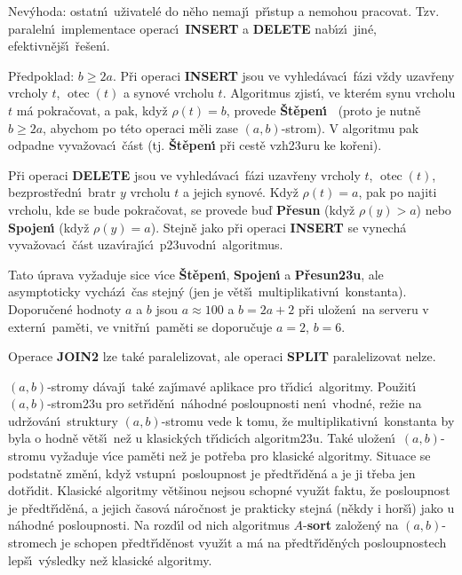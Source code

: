 \documentclass[a4paper,12pt]{article}
\DeclareMathOperator*{\otec}{otec}
\begin{document}
\flushpar Nev\'yhoda: ostatn\'\i\ u\v zivatel\'e  
do n\v eho nemaj\'\i\ p\v r\'\i stup a nemohou pracovat. Tzv. paraleln\'\i\ 
implementace operac\'\i\ {\bf INSERT} a {\bf DELETE} nab\'\i z\'\i\ jin\'e, 
efektivn\v ej\v s\'\i\ \v re\v sen\'\i .
\medskip

\flushpar P\v redpoklad: $b\ge 2a$. \newline 
P\v ri operaci {\bf INSERT} jsou ve vyhled\'avac\'\i\ f\'azi v\v zdy 
uzav\v reny vrcholy $t$, $\otec(t)$ a synov\'e vrcholu $t$. 
Algoritmus zjist\'\i , ve kter\'em synu vrcholu $t$ m\'a 
pokra\v covat, a pak, kdy\v z $\rho (t)=b$, provede {\bf \v St\v epen\'\i\ }
(proto je nutn\v e $b\ge 2a$, abychom po t\'eto ope\-raci m\v eli 
zase $(a,b)$-strom). V algoritmu pak odpadne vyva\-\v zo\-vac\'\i\ 
\v c\'ast (tj. {\bf \v St\v epen\'\i} p\v ri cest\v e vzh\accent23uru ke 
ko\v reni).
\medskip

\flushpar P\v ri operaci {\bf DELETE} jsou ve vyhled\'avac\'\i\ f\'azi uzav\v reny 
vrcholy $t$, $\otec(t)$, bezprost\v redn\'\i\ bratr $y$ vrcholu $
t$ a 
jejich synov\'e. 
Kdy\v z $\rho (t)=a$, pak po najiti vrcholu, kde se bude 
pokra\v covat, se provede bu\v d {\bf P\v resun} (kdy\v z $\rho (
y)>a$) nebo 
{\bf Spojen\'\i} (kdy\v z $\rho (y)=a$). Stejn\v e jako p\v ri operaci 
{\bf INSERT} se vynech\'a vyva\-\v zo\-vac\'\i\ \v c\'ast 
uzav\'\i raj\'\i c\'\i\ p\accent23uvodn\'\i\ algoritmus.
\medskip

\flushpar Tato \'uprava vy\v zaduje sice v\'\i ce {\bf \v St\v epen\'\i }, {\bf Spojen\'\i} a
{\bf P\v resun\accent23u}, ale asymptoticky vych\'az\'\i\ \v cas stejn\'y 
(jen je v\v et\v s\'\i\ multiplikativn\'\i\ konstanta). Doporu\v cen\'e 
hodnoty $a$ a $b$ jsou $a\approx 100$ a $b=2a+2$ p\v ri ulo\v zen\'\i\ na serveru 
v extern\'\i\ pam\v eti, ve vnit\v rn\'\i\ pam\v eti 
se doporu\v cuje $a=2$, $b=6$.
\medskip

\flushpar Operace {\bf JOIN2} lze tak\'e paralelizovat, ale operaci {\bf SPLIT  }
paralelizovat nelze.
\medskip

\flushpar$(a,b)$-stromy d\'avaj\'\i\ tak\'e zaj\'\i mav\'e aplikace pro 
t\v r\'\i dic\'\i\ 
algoritmy. Pou\v zit\'\i\ $(a,b)$-strom\accent23u pro set\v r\'\i d\v en\'\i\ 
n\'ahodn\'e posloupnosti nen\'\i\ vhodn\'e, re\v zie na udr\v zov\'an\'\i\ 
struktury $(a,b)$-stromu vede k tomu, \v ze multiplikativn\'\i\ 
konstanta by byla o hodn\v e v\v et\v s\'\i\ ne\v z u klasick\'ych 
t\v r\'\i dic\'\i ch algoritm\accent23u. Tak\'e ulo\v zen\'\i\ $(
a,b)$-stromu 
vy\v zaduje v\'\i ce pam\v eti ne\v z je pot\v reba pro klasick\'e 
algoritmy. Situace se podstatn\v e zm\v en\'\i , kdy\v z vstupn\'\i\ 
posloupnost je p\v red\-t\v r\'\i\-d\v en\'a a je ji t\v reba jen dot\v r\'\i dit. 
Klasick\'e algoritmy v\v et\v sinou nejsou schopn\'e vyu\v z\'\i t faktu, \v ze 
posloupnost je p\v redt\v r\'\i d\v en\'a, a jejich \v casov\'a n\'aro\v cnost je 
prakticky stejn\'a (n\v ekdy i hor\v s\'\i ) jako u n\'ahodn\'e 
posloupnosti. Na rozd\'\i l od nich algoritmus $A$-{\bf sort }
zalo\v zen\'y na $(a,b)$-stromech je schopen p\v redt\v r\'\i d\v enost 
vyu\v z\'\i t a m\'a na p\v redt\v r\'\i d\v en\'ych posloupnostech lep\v s\'\i\ 
v\'ysledky ne\v z klasick\'e algoritmy.
\medskip
\end{document}
